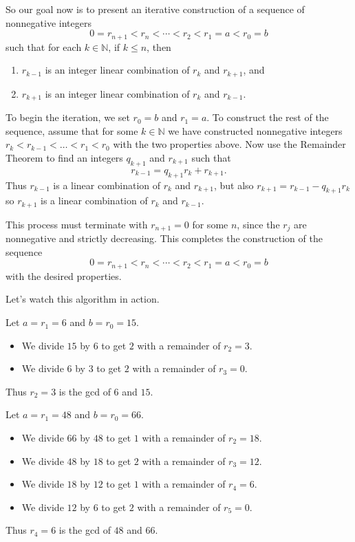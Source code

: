 \documentclass[11pt,dvipsnames]{book}
\def\N{{\mathbb{N}}}
\numberwithin{figure}{section} %
\numberwithin{table}{section} %
\begin{document}
So our goal now is to present an iterative construction of a sequence of nonnegative integers
\[
0 = r_{n+1} < r_n < \cdots < r_2 < r_1 = a < r_0 = b
\]
such that for each $k \in \N$, if $k\leq n$, then
\begin{enumerate}
    \item $r_{k-1}$ is an integer linear combination of $r_k$ and $r_{k+1}$, and
    \item $r_{k+1}$ is an integer linear combination of $r_k$ and $r_{k-1}$.
\end{enumerate}

To begin the iteration, we set $r_0 = b$ and $r_1 = a$.
To construct the rest of the sequence, assume that for some $k\in\N$ we have constructed nonnegative integers $r_k < r_{k-1} < \dots < r_1 < r_0$ with the two properties above.
Now use the Remainder Theorem to find an integers $q_{k+1}$ and $r_{k+1}$ such that
\[
r_{k-1} = q_{k+1}r_k + r_{k+1}.
\]
Thus $r_{k-1}$ is a linear combination of $r_k$ and $r_{k+1}$, but also $r_{k+1} = r_{k-1} - q_{k+1} r_k$ so $r_{k+1}$ is a linear combination of $r_k$ and $r_{k-1}$.

This process must terminate with $r_{n+1}=0$ for some $n$, since the $r_{j}$ are nonnegative and strictly decreasing.
This completes the construction of the sequence
\[
0 = r_{n+1} < r_n < \cdots < r_2 < r_1 = a < r_0 = b
\]
with the desired properties.

Let's watch this algorithm in action.
\begin{example}
Let $a = r_1 = 6$ and $b = r_0 = 15$.
\begin{itemize}
    \item We divide $15$ by $6$ to get $2$ with a remainder of $r_2=3$.
    \item We divide $6$ by $3$ to get $2$ with a remainder of $r_3 = 0$.
\end{itemize}
Thus $r_2 = 3$ is the gcd of $6$ and $15$.
\end{example}

\begin{example}
Let $a = r_1 = 48$ and $b = r_0 = 66$.
\begin{itemize}
    \item We divide $66$ by $48$ to get $1$ with a remainder of $r_2=18$.
    \item We divide $48$ by $18$ to get $2$ with a remainder of $r_3 = 12$.
    \item We divide $18$ by $12$ to get $1$ with a remainder of $r_4 = 6$.
    \item We divide $12$ by $6$ to get $2$ with a remainder of $r_5 = 0$.
\end{itemize}
Thus $r_4 = 6$ is the gcd of $48$ and $66$.
\end{example}
\end{document}

